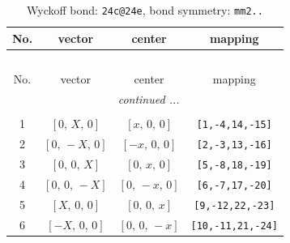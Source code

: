 \documentclass[fleqn,8pt]{jsarticle}
\begin{document}
\begin{longtable}{cccc}
\caption{Wyckoff bond: {\tt 24c@24e}, bond symmetry: {\tt mm2..}}
 \\
 \hline \hline
No. & vector & center & mapping \\ \hline \endfirsthead

\multicolumn{3}{l}{\tablename\ \thetable{}} \\
 \hline \hline
No. & vector & center & mapping \\ \hline \endhead

 \hline \hline
\multicolumn{3}{r}{\footnotesize\it continued ...} \\ \endfoot

 \hline \hline
\multicolumn{3}{r}{} \\ \endlastfoot

1 & $\left[ 0,\, X,\, 0 \right]$ & $\left[ x,\, 0,\, 0 \right]$ & {\tt [1,-4,14,-15]} \\ \hline
2 & $\left[ 0,\, - X,\, 0 \right]$ & $\left[ - x,\, 0,\, 0 \right]$ & {\tt [2,-3,13,-16]} \\ \hline
3 & $\left[ 0,\, 0,\, X \right]$ & $\left[ 0,\, x,\, 0 \right]$ & {\tt [5,-8,18,-19]} \\ \hline
4 & $\left[ 0,\, 0,\, - X \right]$ & $\left[ 0,\, - x,\, 0 \right]$ & {\tt [6,-7,17,-20]} \\ \hline
5 & $\left[ X,\, 0,\, 0 \right]$ & $\left[ 0,\, 0,\, x \right]$ & {\tt [9,-12,22,-23]} \\ \hline
6 & $\left[ - X,\, 0,\, 0 \right]$ & $\left[ 0,\, 0,\, - x \right]$ & {\tt [10,-11,21,-24]} \\
\end{longtable}
\renewcommand{\arraystretch}{1.2}
\end{document}
